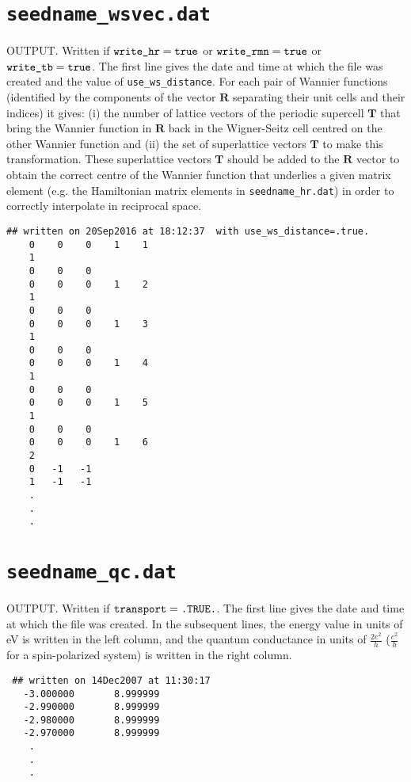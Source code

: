 \section{{\tt seedname\_wsvec.dat}}
OUTPUT.
Written if $\verb#write_hr#=\verb#true#$ or $\verb#write_rmn#=\verb#true#$ or $\verb#write_tb#=\verb#true#$. The first line gives the date and
time at which the file was created and the value of {\tt use\_ws\_distance}. 
For each pair of Wannier functions (identified by the components of the vector $\mathbf{R}$ separating their unit cells and their indices) it gives: (i) the number of lattice vectors of the periodic supercell $\mathbf{T}$ that bring the Wannier function in $\mathbf{R}$ back in the Wigner-Seitz cell centred on the other Wannier function and (ii) the set of superlattice vectors $\mathbf{T}$ to make this transformation. 
These superlattice vectors $\mathbf{T}$ should be added to the $\mathbf{R}$ vector to obtain the correct centre of the Wannier function that underlies a given matrix element (e.g. the Hamiltonian matrix elements in {\tt seedname\_hr.dat}) in order to correctly interpolate in reciprocal space.

\begin{verbatim}
## written on 20Sep2016 at 18:12:37  with use_ws_distance=.true.
    0    0    0    1    1
    1
    0    0    0
    0    0    0    1    2
    1
    0    0    0
    0    0    0    1    3
    1
    0    0    0
    0    0    0    1    4
    1
    0    0    0
    0    0    0    1    5
    1
    0    0    0
    0    0    0    1    6
    2
    0   -1   -1
    1   -1   -1
    .
    .
    .  
\end{verbatim}

\section{{\tt seedname\_qc.dat}}
OUTPUT. Written if $\verb#transport#=\verb#.TRUE.#$.
The first line gives the date and
time at which the file was created. 
In the subsequent lines, the energy value
in units of eV is written in the left column,
and the quantum conductance in units of 
$\frac{2e^2}{h}$ ($\frac{e^2}{h}$
for a spin-polarized system)
is written in the right column.

\begin{verbatim}
 ## written on 14Dec2007 at 11:30:17
   -3.000000       8.999999
   -2.990000       8.999999
   -2.980000       8.999999
   -2.970000       8.999999
    .
    .
    .
\end{verbatim}

